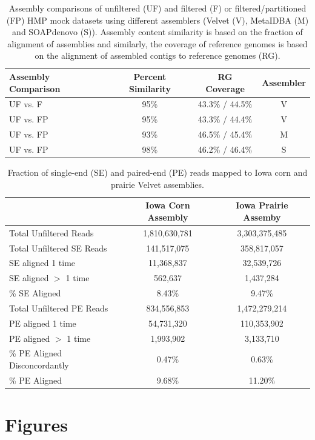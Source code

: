 \documentclass[11pt]{article} %
\begin{document}
\begin{table}[ht]
\caption{Assembly comparisons of unfiltered (UF) and filtered (F) or
  filtered/partitioned (FP) HMP mock datasets using different
  assemblers (Velvet (V), MetaIDBA (M) and SOAPdenovo (S)).  Assembly
  content similarity is based on the fraction of alignment of
  assemblies and similarly, the coverage of reference genomes is based
  on the alignment of assembled contigs to reference genomes (RG).}
\begin{tabular}{l c c c}
Assembly Comparison & Percent Similarity & RG Coverage & Assembler \\
\hline
UF vs. F & 95\% & 43.3\% / 44.5\% & V \\
UF vs. FP & 95\% & 43.3\% / 44.4\% & V\\
UF vs. FP & 93\% & 46.5\% / 45.4\% & M\\ 
UF vs. FP & 98\% &  46.2\% / 46.4\% & S\\
\end{tabular}
\label{assembly-compare}
\end{table}

\begin{table}[ht]
\caption{Fraction of single-end (SE) and paired-end (PE) reads mapped
  to Iowa corn and prairie Velvet assemblies.}
\begin{tabular}{l c c}
 & Iowa Corn Assembly & Iowa Prairie Assemby \\
 \hline
Total Unfiltered Reads	& 1,810,630,781	& 3,303,375,485\\
Total Unfiltered SE Reads &	141,517,075 &	358,817,057\\
SE aligned 1 time	& 11,368,837	& 32,539,726\\
SE aligned $>$ 1 time	& 562,637	& 1,437,284\\
\% SE Aligned & 	8.43\% &	9.47\% \\
Total Unfiltered PE Reads & 	834,556,853	& 1,472,279,214\\
PE aligned 1 time	& 54,731,320	& 110,353,902\\
PE aligned $>$ 1 time	&1,993,902	 & 3,133,710\\
\% PE Aligned Disconcordantly	 & 0.47\% &	 0.63\%\\
\% PE Aligned	& 9.68\%	& 11.20\%\\
\end{tabular}
\label{read-map}
\end{table}

\pagebreak
\section{Figures}
\end{document}
